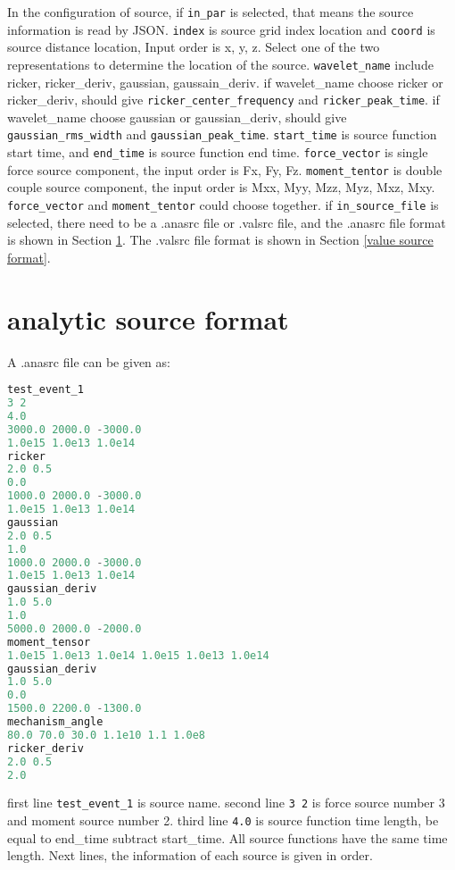 In the configuration of source, if \texttt{in\_par} is selected, that means the source information is read by JSON. \texttt{index} is source grid index location and \texttt{coord} is source distance location, Input order is x, y, z. Select one of the two representations to determine the location of the source. \texttt{wavelet\_name} include ricker, ricker\_deriv, gaussian, gaussain\_deriv. if wavelet\_name choose ricker or ricker\_deriv, should give \texttt{ricker\_center\_frequency} and \texttt{ricker\_peak\_time}. if wavelet\_name choose gaussian or gaussian\_deriv, should give \texttt{gaussian\_rms\_width} and \texttt{gaussian\_peak\_time}. \texttt{start\_time} is source function start time, and \texttt{end\_time} is source function end time. \texttt{force\_vector} is single force source component, the input order is Fx, Fy, Fz. \texttt{moment\_tentor} is double couple source component, the input order is Mxx, Myy, Mzz, Myz, Mxz, Mxy. \texttt{force\_vector} and \texttt{moment\_tentor} could choose together.
if \texttt{in\_source\_file} is selected, there need to be a .anasrc file or .valsrc file, and the .anasrc file format is shown in Section \ref{analytic source format}. The .valsrc file format is shown in Section \ref{value source format}.

\section{analytic source format} \label{analytic source format}

A .anasrc file can be given as:

\begin{lstlisting}[language=python, title=source.anasrc, frame=tb]
test_event_1
3 2
4.0 
3000.0 2000.0 -3000.0
1.0e15 1.0e13 1.0e14
ricker
2.0 0.5
0.0
1000.0 2000.0 -3000.0
1.0e15 1.0e13 1.0e14
gaussian
2.0 0.5
1.0
1000.0 2000.0 -3000.0
1.0e15 1.0e13 1.0e14
gaussian_deriv
1.0 5.0
1.0
5000.0 2000.0 -2000.0
moment_tensor
1.0e15 1.0e13 1.0e14 1.0e15 1.0e13 1.0e14
gaussian_deriv
1.0 5.0
0.0
1500.0 2200.0 -1300.0
mechanism_angle
80.0 70.0 30.0 1.1e10 1.1 1.0e8 
ricker_deriv
2.0 0.5
2.0
\end{lstlisting}

first line \texttt{test\_event\_1} is source name. second line \texttt{3 2} is force source number 3 and moment source number 2. third line \texttt{4.0} is source function time length, be equal to end\_time subtract start\_time. All source functions have the same time length. Next lines, the information of each source is given in order. 

